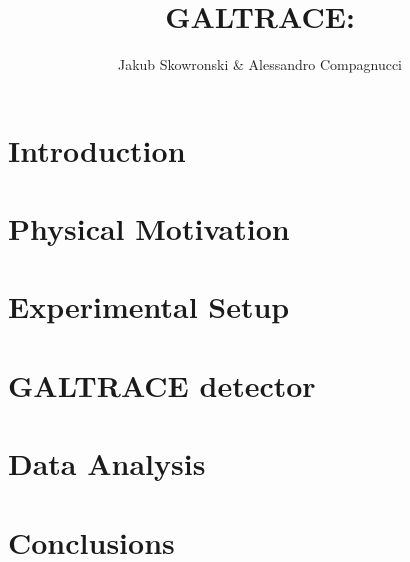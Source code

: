 \documentclass[a4paper, 11pt]{article}
\author{Jakub Skowronski \& Alessandro Compagnucci}
\title{GALTRACE: }
\begin{document}
\maketitle

\clearpage

\tableofcontents

\clearpage

\section{Introduction}



\clearpage

\section{Physical Motivation}



\clearpage

\section{Experimental Setup}



\clearpage

\section{GALTRACE detector}



\clearpage

\section{Data Analysis}




\clearpage

\section{Conclusions}



\clearpage


\end{document}
